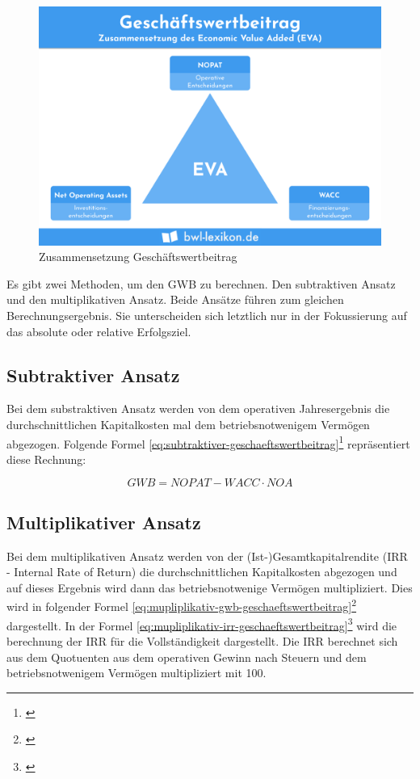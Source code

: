 \begin{figure}[!h]
    \includegraphics[width=\linewidth]{./media/economic-value-added.png}
    \caption{Zusammensetzung Geschäftswertbeitrag}
    \label{fig:zsmgeschaeftswertbeitrag}
\end{figure}

Es gibt zwei Methoden, um den GWB zu berechnen. Den subtraktiven Ansatz und den multiplikativen Ansatz. Beide Ansätze führen zum gleichen Berechnungsergebnis. Sie unterscheiden sich letztlich nur in der Fokussierung auf das absolute oder relative Erfolgsziel.

\subsection{Subtraktiver Ansatz}

Bei dem substraktiven Ansatz werden von dem operativen Jahresergebnis die durchschnittlichen Kapitalkosten mal dem betriebsnotwenigem Vermögen abgezogen. Folgende Formel \eqref{eq:subtraktiver-geschaeftswertbeitrag}\footnote{\cite{wikipedia-eva}} repräsentiert diese Rechnung:

\begin{equation}
    GWB = NOPAT - WACC \cdot NOA
    \label{eq:subtraktiver-geschaeftswertbeitrag}
\end{equation}

\subsection{Multiplikativer Ansatz}

Bei dem multiplikativen Ansatz werden von der (Ist-)Gesamtkapitalrendite (IRR - Internal Rate of Return) die durchschnittlichen Kapitalkosten abgezogen und auf dieses Ergebnis wird dann das betriebsnotwenige Vermögen multipliziert. Dies wird in folgender Formel \eqref{eq:mupliplikativ-gwb-geschaeftswertbeitrag}\footnote{\cite{wikipedia-eva}} dargestellt. In der Formel \eqref{eq:mupliplikativ-irr-geschaeftswertbeitrag}\footnote{\cite{controllingportal-eva}} wird die berechnung der IRR für die Vollständigkeit dargestellt. Die IRR berechnet sich aus dem Quotuenten aus dem operativen Gewinn nach Steuern und dem  betriebsnotwenigem Vermögen multipliziert mit 100.

